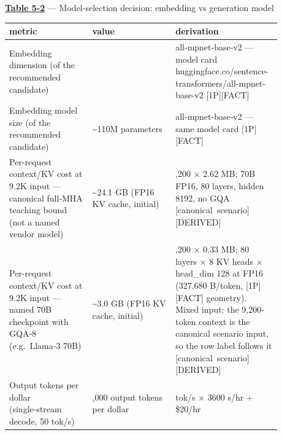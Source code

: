 \Needspace{250pt}

\textbf{\hyperref[tab:5.2]{Table 5-2}} --- Model-selection decision: embedding vs generation
model

\nopagebreak[4]
\begin{longtable}[]{@{}
  >{\raggedright\arraybackslash}p{0.2927\linewidth}
  >{\raggedright\arraybackslash}p{0.2927\linewidth}
  >{\raggedright\arraybackslash}p{0.2927\linewidth}@{}}
\toprule\noalign{}
\begin{minipage}[b]{\linewidth}\raggedright
metric
\end{minipage} & \begin{minipage}[b]{\linewidth}\raggedright
value
\end{minipage} & \begin{minipage}[b]{\linewidth}\raggedright
derivation
\end{minipage} \\
\midrule\noalign{}
\endhead
\bottomrule\noalign{}
\endlastfoot
Embedding dimension (of the recommended candidate) & 768 &
all‑mpnet‑base‑v2 --- model card
huggingface.co/sentence-transformers/all-mpnet-base-v2
\mbox{{[}1P{]}}\hspace{0pt}\mbox{{[}FACT{]}} \\
\noalign{\label{tab:5.2}}
Embedding model size (of the recommended candidate) &
\textasciitilde110M parameters & all‑mpnet‑base‑v2 --- same model card
\mbox{{[}1P{]}}\hspace{0pt}\mbox{{[}FACT{]}} \\
Per-request context/KV cost at 9.2K input --- canonical full‑MHA
teaching bound (not a named vendor model) & \textasciitilde24.1 GB (FP16
KV cache, initial) & 9,200 × 2.62 MB; 70B FP16, 80 layers, hidden 8192,
no GQA \mbox{{[}canonical scenario{]}}\hspace{0pt}\mbox{{[}DERIVED{]}} \\
Per-request context/KV cost at 9.2K input --- named 70B checkpoint with
GQA‑8 (e.g.~Llama‑3 70B) & \textasciitilde3.0 GB (FP16 KV cache,
initial) & 9,200 × 0.33 MB; 80 layers × 8 KV heads × head\_dim 128 at
FP16 (327,680 B/token, \mbox{{[}1P{]}}\hspace{0pt}\mbox{{[}FACT{]}} geometry). Mixed input: the
9,200-token context is the canonical scenario input, so the row label
follows it \mbox{{[}canonical scenario{]}}\hspace{0pt}\mbox{{[}DERIVED{]}} \\
Output tokens per dollar (single‑stream decode, 50 tok/s) & 9,000 output
tokens per dollar & 50 tok/s × 3600 s/hr ÷ \$20/hr

\end{longtable}
